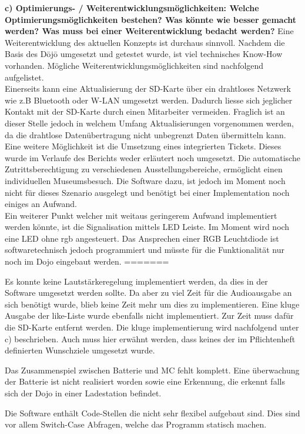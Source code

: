\textbf{c) Optimierungs- / Weiterentwicklungsmöglichkeiten: Welche Optimierungsmöglichkeiten bestehen? Was könnte wie besser gemacht werden? Was muss bei einer Weiterentwicklung bedacht werden?}
Eine Weiterentwicklung des aktuellen Konzepts ist durchaus sinnvoll. Nachdem die Basis des Dōjō umgesetzt und getestet wurde, ist viel technisches \glqq Know-How \grqq vorhanden. Mögliche Weiterentwicklungsmöglichkeiten sind nachfolgend aufgelistet.\\
Einerseits kann eine Aktualisierung der SD-Karte über ein drahtloses Netzwerk wie z.B Bluetooth oder W-LAN umgesetzt werden. Dadurch liesse sich jeglicher Kontakt mit der SD-Karte durch einen Mitarbeiter vermeiden. Fraglich ist an dieser Stelle jedoch in welchem Umfang Aktualisierungen vorgenommen werden, da die drahtlose Datenübertragung nicht unbegrenzt Daten übermitteln kann.\\
Eine weitere Möglichkeit ist die Umsetzung eines integrierten Tickets. Dieses wurde im Verlaufe des Berichts weder erläutert noch umgesetzt. Die automatische Zutrittsberechtigung zu verschiedenen Ausstellungsbereiche, ermöglicht einen individuellen Museumsbesuch. Die Software dazu, ist jedoch im Moment noch nicht für dieses Szenario ausgelegt und benötigt bei einer Implementation noch einiges an Aufwand.\\
Ein weiterer Punkt welcher mit weitaus geringerem Aufwand implementiert werden könnte, ist die Signalisation mittels LED Leiste. Im Moment wird noch eine LED ohne rgb angesteuert. Das Ansprechen einer RGB Leuchtdiode ist softwaretechnisch jedoch programmiert und müsste für die Funktionalität nur noch im Dojo eingebaut werden. 
=======

Es konnte keine Lautstärkeregelung implementiert werden, da dies in der Software umgesetzt werden sollte. Da aber zu viel Zeit für die Audioausgabe an sich benötigt wurde, blieb keine Zeit mehr um dies zu implementieren. Eine kluge Ausgabe der like-Liste wurde ebenfalls nicht implementiert. Zur Zeit muss dafür die SD-Karte entfernt werden. Die kluge implementierung wird nachfolgend unter c) beschrieben.  Auch muss hier erwähnt werden, dass keines der im Pflichtenheft definierten Wunschziele umgesetzt wurde.

Das Zusammenspiel zwischen Batterie und MC fehlt komplett. Eine überwachung der Batterie ist nicht realisiert worden sowie eine Erkennung, die erkennt falls sich der Dojo in einer Ladestation befindet.

Die Software enthält Code-Stellen die nicht sehr flexibel aufgebaut sind. Dies sind vor allem Switch-Case Abfragen, welche das Programm statisch machen.
 
